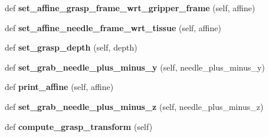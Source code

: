 \begin{DoxyCompactItemize}
\item 
def {\bfseries set\+\_\+affine\+\_\+grasp\+\_\+frame\+\_\+wrt\+\_\+gripper\+\_\+frame} (self, affine)\hypertarget{classneedle__planner__camera__working_1_1needle__planner_ae4389944d7905879735f69641ec6c23a}{}\label{classneedle__planner__camera__working_1_1needle__planner_ae4389944d7905879735f69641ec6c23a}

\item 
def {\bfseries set\+\_\+affine\+\_\+needle\+\_\+frame\+\_\+wrt\+\_\+tissue} (self, affine)\hypertarget{classneedle__planner__camera__working_1_1needle__planner_a4d5d392b20b0a385b8b5f6d4b80defe8}{}\label{classneedle__planner__camera__working_1_1needle__planner_a4d5d392b20b0a385b8b5f6d4b80defe8}

\item 
def {\bfseries set\+\_\+grasp\+\_\+depth} (self, depth)\hypertarget{classneedle__planner__camera__working_1_1needle__planner_a01dbe95e7c158f93602ef9f69c2ac814}{}\label{classneedle__planner__camera__working_1_1needle__planner_a01dbe95e7c158f93602ef9f69c2ac814}

\item 
def {\bfseries set\+\_\+grab\+\_\+needle\+\_\+plus\+\_\+minus\+\_\+y} (self, needle\+\_\+plus\+\_\+minus\+\_\+y)\hypertarget{classneedle__planner__camera__working_1_1needle__planner_a05e2fb002c8666c564008bf77950319e}{}\label{classneedle__planner__camera__working_1_1needle__planner_a05e2fb002c8666c564008bf77950319e}

\item 
def {\bfseries print\+\_\+affine} (self, affine)\hypertarget{classneedle__planner__camera__working_1_1needle__planner_a7f5e4af1329a954de87171caf118797d}{}\label{classneedle__planner__camera__working_1_1needle__planner_a7f5e4af1329a954de87171caf118797d}

\item 
def {\bfseries set\+\_\+grab\+\_\+needle\+\_\+plus\+\_\+minus\+\_\+z} (self, needle\+\_\+plus\+\_\+minus\+\_\+z)\hypertarget{classneedle__planner__camera__working_1_1needle__planner_a102cd518ac211f19ab00390636989b61}{}\label{classneedle__planner__camera__working_1_1needle__planner_a102cd518ac211f19ab00390636989b61}

\item 
def {\bfseries compute\+\_\+grasp\+\_\+transform} (self)\hypertarget{classneedle__planner__camera__working_1_1needle__planner_a29f33adb34ea7171af582eba61d2ba41}{}\label{classneedle__planner__camera__working_1_1needle__planner_a29f33adb34ea7171af582eba61d2ba41}


\end{DoxyCompactItemize}
